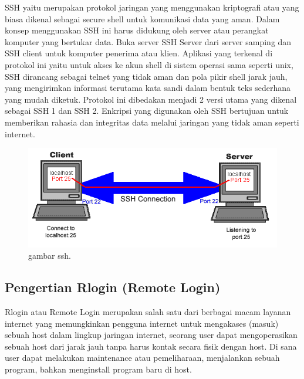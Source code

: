 SSH yaitu merupakan protokol jaringan yang menggunakan kriptografi atau yang biasa dikenal sebagai secure shell untuk komunikasi data yang aman. Dalam konsep menggunakan SSH ini harus didukung oleh server atau perangkat komputer yang bertukar data. Buka server SSH Server dari server samping dan SSH client untuk komputer penerima atau klien.
Aplikasi yang terkenal di protokol ini yaitu untuk akses ke akun shell di sistem operasi sama seperti unix, SSH dirancang sebagai telnet yang tidak aman dan pola pikir shell jarak jauh, yang mengirimkan informasi terutama kata sandi dalam bentuk teks sederhana yang mudah diketuk. Protokol ini dibedakan menjadi 2 versi utama yang dikenal sebagai SSH 1 dan SSH 2. Enkripsi yang digunakan oleh SSH bertujuan untuk memberikan rahasia dan integritas data melalui jaringan yang tidak aman seperti internet. 

\begin{figure}[ht]
\centerline{\includegraphics[width=1\textwidth]{figures/ssh.gif}}
\caption{gambar ssh.}
\label{ssh}
\end{figure}

 
\subsection {Pengertian Rlogin (Remote Login)}

Rlogin atau Remote Login merupakan salah satu dari berbagai macam layanan internet yang memungkinkan pengguna internet untuk mengakases (masuk)  sebuah host dalam lingkup jaringan internet, seorang user dapat mengoperasikan sebuah host dari jarak jauh tanpa harus kontak secara fisik dengan host. Di sana user dapat melakukan maintenance atau pemeliharaan, menjalankan sebuah program, bahkan menginstall program baru di host.

